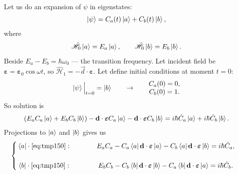 Let us do an expansion of $\psi$ in eigenstates:
\begin{equation}
	\left\lvert {\psi} \right\rangle = C_a(t) \left\lvert {a} \right\rangle + C_b(t) \left\lvert {b} \right\rangle,
\end{equation}
where
\begin{equation}
	\hat{\mathscr{H}}_0 \left\lvert {a} \right\rangle = E_a \left\lvert {a} \right\rangle, \qquad \hat{\mathscr{H}}_0 \left\lvert {b} \right\rangle = E_b \left\lvert {b} \right\rangle.
\end{equation}
Beside $E_a - E_b = \hbar \omega_0$ --- the transition frequency. Let incident field be $\bm{\varepsilon} = \bm{\varepsilon}_0 \cos \omega t$, so $\hat{\mathscr{H}}_1 = - \vec{d} \cdot \bm{\varepsilon}$. Let define initial conditions at moment $t = 0$:
\begin{equation}
	\left\lvert {\psi} \right\rangle \Big|_{t = 0} = \left\lvert {b} \right\rangle \qquad \to \qquad
	\begin{matrix}
		C_a(0) = 0, \\
		C_b(0) = 1.
	\end{matrix}
\end{equation}
So solution is
\begin{equation}
	\left( E_a C_a \left\lvert {a} \right\rangle + E_b C_b \left\lvert {b} \right\rangle \right) - \mathbf{d} \cdot \bm{\varepsilon} C_a \left\lvert {a} \right\rangle - \mathbf{d} \cdot \bm{\varepsilon} C_b \left\lvert {b} \right\rangle = i \hbar \dot{C}_a \left\lvert {a} \right\rangle + i \hbar \dot{C}_b \left\lvert {b} \right\rangle.
	\label{eq:tmp150}
\end{equation}
Projections to $\left\lvert {a} \right\rangle$ and $\left\lvert {b} \right\rangle$ gives us 
\begin{equation}
\begin{cases}
	\begin{matrix}
	\left\langle {a} \right\rvert \cdot \eqref{eq:tmp150}: &\qquad&
	E_a C_a - C_a \left\langle {a} \right\rvert \mathbf{d} \cdot \bm{\varepsilon} \left\lvert {a} \right\rangle - C_b \left\langle {a} \right\rvert \mathbf{d} \cdot \bm{\varepsilon} \left\lvert {b} \right\rangle = i \hbar \dot{C}_a, \\  \\
	\left\langle {b} \right\rvert \cdot \eqref{eq:tmp150}: &\qquad& 
	E_b C_b - C_b \left\langle {b} \right\rvert \mathbf{d} \cdot \bm{\varepsilon} \left\lvert {b} \right\rangle - C_a \left\langle {b} \right\rvert \mathbf{d} \cdot \bm{\varepsilon} \left\lvert {a} \right\rangle = i \hbar \dot{C}_b.
	\end{matrix}
\end{cases}
\label{eq:tmp151}
\end{equation}

